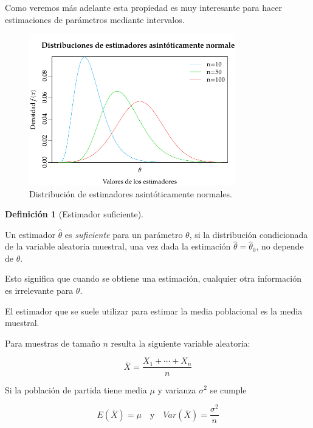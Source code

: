 \documentclass[
  a4paper,
]{scrreport}
\theoremstyle{plain}
\theoremstyle{definition}
\theoremstyle{definition}
\newtheorem{definition}{Definición}[chapter]
\theoremstyle{remark}
\begin{document}
Como veremos más adelante esta propiedad es muy interesante para hacer
estimaciones de parámetros mediante intervalos.

\begin{figure}

{\centering \includegraphics[width=0.8\textwidth,height=\textheight]{img/estimacion/estimador-asintoticamente-normal.pdf}

}

\caption{Distribución de estimadores asintóticamente normales.}

\end{figure}

\begin{definition}[Estimador
suficiente]\protect\hypertarget{def-estimador-suficiente}{}\label{def-estimador-suficiente}

Un estimador \(\hat \theta\) es \emph{suficiente} para un parámetro
\(\theta\), si la distribución condicionada de la variable aleatoria
muestral, una vez dada la estimación \(\hat \theta = \hat \theta_0\), no
depende de \(\theta\).

\end{definition}

Esto significa que cuando se obtiene una estimación, cualquier otra
información es irrelevante para \(\theta\).

El estimador que se suele utilizar para estimar la media poblacional es
la media muestral.

Para muestras de tamaño \(n\) resulta la siguiente variable aleatoria:

\[
\bar X = \frac{X_1+\cdots+X_n}{n}
\]

Si la población de partida tiene media \(\mu\) y varianza \(\sigma^2\)
se cumple

\[
E(\bar X) = \mu \quad \mbox{y} \quad Var(\bar X)=\frac{\sigma^2}{n}
\]
\end{document}
